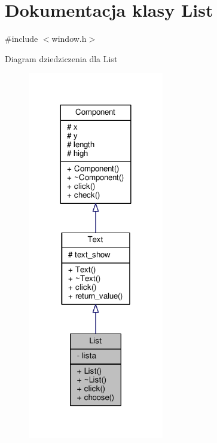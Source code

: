 \hypertarget{classList}{}\section{Dokumentacja klasy List}
\label{classList}


{\ttfamily \#include $<$window.\+h$>$}



Diagram dziedziczenia dla List\nopagebreak
\begin{figure}[H]
\begin{center}
\leavevmode
\includegraphics[width=168pt]{classList__inherit__graph}
\end{center}
\end{figure}


